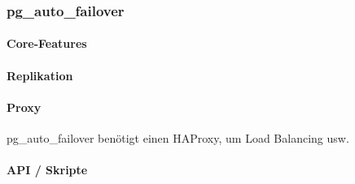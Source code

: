 
\begin{flushleft}
    \subsubsection{pg\_auto\_failover}
\end{flushleft}
\begin{flushleft}
    \paragraph{Core-Features}
\end{flushleft}
\begin{flushleft}
    \paragraph{Replikation}
\end{flushleft}
\begin{flushleft}
    \paragraph{Proxy}
    pg\_auto\_failover benötigt einen \Gls{HAProxy}, um Load Balancing usw. \cite{VYXTI7BS}
\end{flushleft}
\begin{flushleft}
    \paragraph{API / Skripte}

\end{flushleft}
